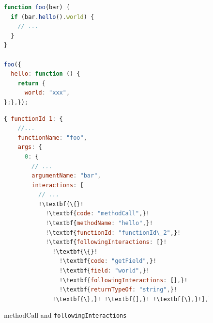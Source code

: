 \documentclass[sigplan,screen]{acmart}
\begin{document}
\begin{figure}[t]
      \begin{lstlisting}[language=JavaScript,numbers=none]
function foo(bar) {
  if (bar.hello().world) {
    // ...
  }
}

foo({
  hello: function () {
    return {
      world: "xxx",
};},});    
      \end{lstlisting}

      \begin{lstlisting}[language=JavaScript,numbers=none,escapechar=!]
{ functionId_1: {
    //...
    functionName: "foo",
    args: {
      0: {
        // ...
        argumentName: "bar",
        interactions: [
          // ...
          !\textbf{\{}!
            !\textbf{code: "methodCall",}!
            !\textbf{methodName: "hello",}!
            !\textbf{functionId: "functionId\_2",}!
            !\textbf{followingInteractions: [}!
              !\textbf{\{}!
                !\textbf{code: "getField",}!
                !\textbf{field: "world",}!
                !\textbf{followingInteractions: [],}!
                !\textbf{returnTypeOf: "string",}!
              !\textbf{\},}! !\textbf{],}! !\textbf{\},}!],},},},}
      \end{lstlisting}
  \caption{\texttt{}{methodCall} and \texttt{followingInteractions}}
  \label{fig:example-method-call-interaction}
\end{figure}
\end{document}
